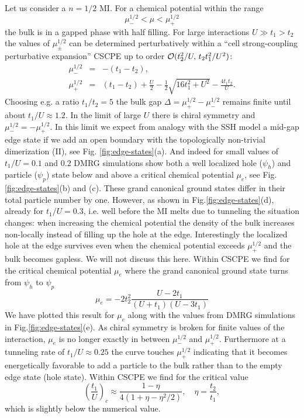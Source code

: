 \documentclass[pra,aps,twocolumn,showpacs]{revtex4}
\begin{document}
Let us consider a $n=1/2$ MI. For a chemical potential within the range
%
\begin{equation}
 \mu_-^{1/2} < \mu < \mu_+^{1/2}
\end{equation}
%
the bulk is in a gapped phase with half filling. 
For large interactions $U\gg t_1>t_2$ the values of $\mu_\pm^{1/2}$ can be determined perturbatively
within a ``cell strong-coupling perturbative expansion'' CSCPE \cite{Freericks1996,BPV-PRB-2004}
up to order ${\cal O}(t_2^2/U,\, t_2t_1^2/U^2)$:
%
\begin{eqnarray}
 \mu_-^{1/2} &=& - (t_1-t_2),\\ 
\mu_+^{1/2} &=& (t_1-t_2 ) +\frac{U}{2}-\frac{1}{2}\sqrt{16t_1^2+U^2} -\frac{4 t_1t_2}{U}.
\end{eqnarray}
%
Choosing e.g. a ratio $t_1/t_2=5$ the bulk gap 
$\Delta=\mu_+^{1/2} - \mu_-^{1/2}$ remains finite until about $t_1/U \approx 1.2$.
In the limit of large $U$ there is chiral symmetry and $\mu_-^{1/2} = - \mu_+^{1/2}$.
In this limit
we expect from analogy with the SSH model a mid-gap edge state if we add an open boundary with the
topologically non-trivial dimerization (II),  see Fig. \ref{fig:edge-states}(a). 
And indeed for small values of $t_1/U=0.1$ and $0.2$ DMRG simulations show both a well 
localized hole ($\psi_h$) and particle ($\psi_p$) state below and above a critical chemical 
potential $\mu_e$, see Fig.\ref{fig:edge-states}(b) and (c). These grand canonical ground states differ 
in their total particle number by one. However, as shown in Fig.\ref{fig:edge-states}(d), already for 
$t_1/U =0.3$, i.e. well before the MI melts due to tunneling the situation changes: when increasing the chemical potential
the density of the bulk increases non-locally instead of filling up the hole at the edge.
Interestingly the localized hole at the edge survives even when the chemical potential exceeds 
$\mu_+^{1/2}$ and the bulk becomes gapless. We will not discuss this here.
Within  CSCPE we find for the critical chemical potential $\mu_e$ where the grand canonical
ground state turns from $\psi_h$ to $\psi_p$
%
\begin{equation}
 \mu_e = - 2t_2^2 \frac{U-2t_1}{(U+t_1)(U-3 t_1)}
\end{equation}
%
We have plotted this result for $\mu_e$ along with the values from DMRG simulations 
in Fig.\ref{fig:edge-states}(e). As chiral symmetry is broken for finite values of the 
interaction, $\mu_e$ is no longer exactly in between $\mu_-^{1/2}$ and $\mu_+^{1/2}$. Furthermore
at a tunneling rate of $t_1/U \approx 0.25$ the curve touches $\mu_+^{1/2}$ indicating that it becomes 
energetically favorable to add a particle to the bulk rather than to the empty edge state (hole state).  
Within CSCPE we find  for the critical value
%
\begin{equation}
 \left(\frac{t_1}{U}\right)_c \approx \frac{1-\eta}{4(1+\eta -\eta^2/2)},\quad \eta=\frac{t_2}{t_1},
\end{equation}
%
\noindent which is slightly below the numerical value.
\end{document}
